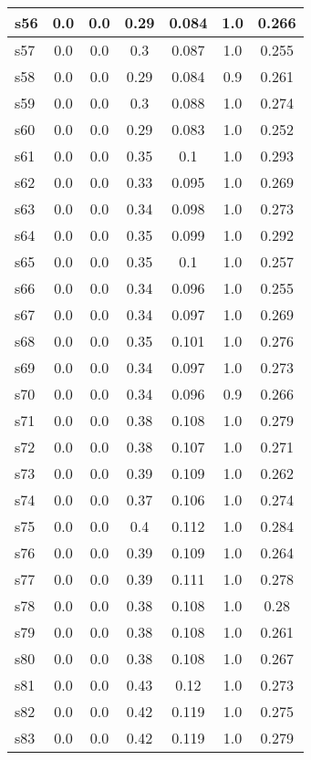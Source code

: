 \documentclass{article}
\begin{document}
\begin{tabular}{|l|c|c|c|c|c|c|}
\hline
s56 &0.0 & 0.0 & 0.29 & 0.084 & 1.0 & 0.266\\
\hline
s57 &0.0 & 0.0 & 0.3 & 0.087 & 1.0 & 0.255\\
\hline
s58 &0.0 & 0.0 & 0.29 & 0.084 & 0.9 & 0.261\\
\hline
s59 &0.0 & 0.0 & 0.3 & 0.088 & 1.0 & 0.274\\
\hline
s60 &0.0 & 0.0 & 0.29 & 0.083 & 1.0 & 0.252\\
\hline
s61 &0.0 & 0.0 & 0.35 & 0.1 & 1.0 & 0.293\\
\hline
s62 &0.0 & 0.0 & 0.33 & 0.095 & 1.0 & 0.269\\
\hline
s63 &0.0 & 0.0 & 0.34 & 0.098 & 1.0 & 0.273\\
\hline
s64 &0.0 & 0.0 & 0.35 & 0.099 & 1.0 & 0.292\\
\hline
s65 &0.0 & 0.0 & 0.35 & 0.1 & 1.0 & 0.257\\
\hline
s66 &0.0 & 0.0 & 0.34 & 0.096 & 1.0 & 0.255\\
\hline
s67 &0.0 & 0.0 & 0.34 & 0.097 & 1.0 & 0.269\\
\hline
s68 &0.0 & 0.0 & 0.35 & 0.101 & 1.0 & 0.276\\
\hline
s69 &0.0 & 0.0 & 0.34 & 0.097 & 1.0 & 0.273\\
\hline
s70 &0.0 & 0.0 & 0.34 & 0.096 & 0.9 & 0.266\\
\hline
s71 &0.0 & 0.0 & 0.38 & 0.108 & 1.0 & 0.279\\
\hline
s72 &0.0 & 0.0 & 0.38 & 0.107 & 1.0 & 0.271\\
\hline
s73 &0.0 & 0.0 & 0.39 & 0.109 & 1.0 & 0.262\\
\hline
s74 &0.0 & 0.0 & 0.37 & 0.106 & 1.0 & 0.274\\
\hline
s75 &0.0 & 0.0 & 0.4 & 0.112 & 1.0 & 0.284\\
\hline
s76 &0.0 & 0.0 & 0.39 & 0.109 & 1.0 & 0.264\\
\hline
s77 &0.0 & 0.0 & 0.39 & 0.111 & 1.0 & 0.278\\
\hline
s78 &0.0 & 0.0 & 0.38 & 0.108 & 1.0 & 0.28\\
\hline
s79 &0.0 & 0.0 & 0.38 & 0.108 & 1.0 & 0.261\\
\hline
s80 &0.0 & 0.0 & 0.38 & 0.108 & 1.0 & 0.267\\
\hline
s81 &0.0 & 0.0 & 0.43 & 0.12 & 1.0 & 0.273\\
\hline
s82 &0.0 & 0.0 & 0.42 & 0.119 & 1.0 & 0.275\\
\hline
s83 &0.0 & 0.0 & 0.42 & 0.119 & 1.0 & 0.279\\
\hline

\end{tabular}
\end{document}
